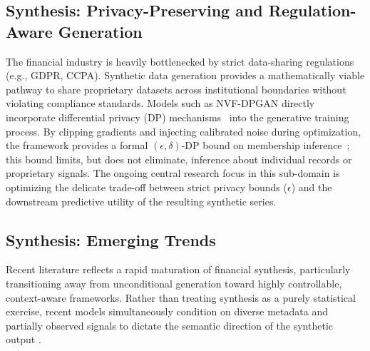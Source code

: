 \documentclass[11pt,a4paper]{article}
\providecommand{\DIFaddbegin}{} %
\providecommand{\DIFaddend}{} %
\providecommand{\DIFdelbegin}{} %
\providecommand{\DIFdelend}{} %
\providecommand{\DIFscaledelfig}{0.5}
\newlength{\DIFdelgraphicswidth} %
\newlength{\DIFdelgraphicsheight} %
\providecommand{\DIFaddincludegraphics}[2][]{{\color{blue}\fbox{\DIFOincludegraphics[#1]{#2}}}} %
\providecommand{\DIFdelincludegraphics}[2][]{%
\sbox{\DIFdelgraphicsbox}{\DIFOincludegraphics[#1]{#2}}%
\settoboxwidth{\DIFdelgraphicswidth}{\DIFdelgraphicsbox} %
\settoboxtotalheight{\DIFdelgraphicsheight}{\DIFdelgraphicsbox} %
\scalebox{\DIFscaledelfig}{%
\parbox[b]{\DIFdelgraphicswidth}{\usebox{\DIFdelgraphicsbox}\\[-\baselineskip] \rule{\DIFdelgraphicswidth}{0em}}\llap{\resizebox{\DIFdelgraphicswidth}{\DIFdelgraphicsheight}{%
\setlength{\unitlength}{\DIFdelgraphicswidth}%
\begin{picture}(1,1)%
\thicklines\linethickness{2pt} %
{\color[rgb]{1,0,0}\put(0,0){\framebox(1,1){}}}%
{\color[rgb]{1,0,0}\put(0,0){\line( 1,1){1}}}%
{\color[rgb]{1,0,0}\put(0,1){\line(1,-1){1}}}%
\end{picture}%
}\hspace*{3pt}}} %
} %
\DeclareRobustCommand{\DIFaddbegin}{\DIFOaddbegin \let\includegraphics\DIFaddincludegraphics} %
\DeclareRobustCommand{\DIFaddend}{\DIFOaddend \let\includegraphics\DIFOincludegraphics} %
\DeclareRobustCommand{\DIFdelbegin}{\DIFOdelbegin \let\includegraphics\DIFdelincludegraphics} %
\DeclareRobustCommand{\DIFdelend}{\DIFOaddend \let\includegraphics\DIFOincludegraphics} %
\begin{document}
\subsection{Synthesis: Privacy-Preserving and Regulation-Aware Generation}

The financial industry is heavily bottlenecked by strict data-sharing regulations (e.g., GDPR, CCPA). Synthetic data generation provides a mathematically viable pathway to share proprietary datasets across institutional boundaries without violating compliance standards. Models such as NVF-DPGAN \citep{NVF-DPGAN} directly incorporate differential privacy (DP) mechanisms~\citep{dwork2006differential,dwork2014algorithmic} into the generative training process. By clipping gradients and injecting calibrated noise during optimization, the framework provides a formal $(\epsilon,\delta)$-DP bound on membership inference~\citep{shokri2017membership}; this bound limits, but does not eliminate, inference about individual records or proprietary signals. The ongoing central research focus in this sub-domain is optimizing the delicate trade-off between strict privacy bounds ($\epsilon$) and the downstream predictive utility of the resulting synthetic series.

\subsection{Synthesis: Emerging Trends}

Recent literature reflects a rapid maturation of financial synthesis, particularly transitioning away from unconditional generation toward highly controllable, context-aware frameworks. Rather than treating synthesis as a purely statistical exercise, recent models simultaneously condition on diverse metadata and partially observed signals to dictate the semantic direction of the synthetic output \DIFdelbegin %
\DIFdelend \DIFaddbegin \citep{wang2024mtsisurvey}\DIFaddend .
\end{document}
